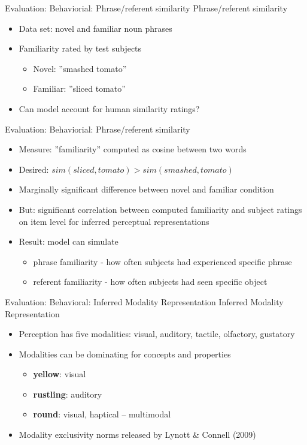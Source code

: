 \documentclass[12pt,a4paper]{beamer}
\begin{document}
\begin{frame}{Evaluation: Behaviorial: Phrase/referent similarity}
Phrase/referent similarity
\begin{itemize}
\item Data set: novel and familiar noun phrases 
\item Familiarity rated by test subjects
    \begin{itemize}
    \item Novel: ''smashed tomato''
    \item Familiar: ''sliced tomato''
    \end{itemize}
\item Can model account for human similarity ratings?
\end{itemize}
\end{frame}

\begin{frame}{Evaluation: Behaviorial: Phrase/referent similarity}
\begin{itemize}
\item Measure: ''familiarity'' computed as cosine between two words
\item Desired: $sim(sliced,tomato) > sim(smashed,tomato)$
\item Marginally significant difference between novel and familiar condition
\item But: significant correlation between computed familiarity and subject ratings on item level for inferred perceptual representations
\item Result: model can simulate
    \begin{itemize}
    \item phrase familiarity - how often subjects had experienced specific phrase
    \item referent familiarity - how often subjects had seen specific object
    \end{itemize}
\end{itemize}
\end{frame}

\begin{frame}{Evaluation: Behavioral: Inferred Modality Representation}
Inferred Modality Representation
\begin{itemize}
\item Perception has five modalities: visual, auditory, tactile, olfactory, gustatory
\item Modalities can be dominating for concepts and properties
\begin{itemize}
    \item \textbf{yellow}: visual
    \item \textbf{rustling}: auditory
    \item \textbf{round}: visual, haptical -- multimodal
\end{itemize}
\item Modality exclusivity norms released by Lynott \& Connell (2009) \cite{lynott} 
\end{itemize}
\end{frame}
\end{document}

